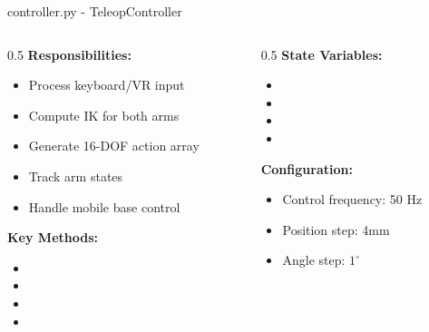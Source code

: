 \begin{frame}{controller.py - TeleopController}
\begin{columns}
\begin{column}{0.5\textwidth}
    \textbf{Responsibilities:}
    \begin{itemize}
        \item Process keyboard/VR input
        \item Compute IK for both arms
        \item Generate 16-DOF action array
        \item Track arm states
        \item Handle mobile base control
    \end{itemize}

    \vspace{0.3cm}

    \textbf{Key Methods:}
    \begin{itemize}
        \item {}
        \item {}
        \item {}
        \item {}
    \end{itemize}
\end{column}
\begin{column}{0.5\textwidth}
    \textbf{State Variables:}
    \begin{itemize}
        \item {}
        \item {}
        \item {}
        \item {}
    \end{itemize}

    \vspace{0.3cm}

    \textbf{Configuration:}
    \begin{itemize}
        \item Control frequency: 50 Hz
        \item Position step: 4mm
        \item Angle step: $1^{\circ}$
    \end{itemize}
\end{column}
\end{columns}
\end{frame}

